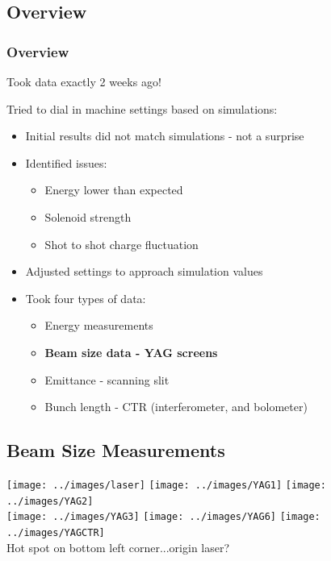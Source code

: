 \documentclass[professionalfonts,t]{beamer}
\begin{document}
\subsection{Overview}
\begin{frame}
	\frametitle{Overview}
Took data exactly 2 weeks ago!

Tried to dial in machine settings based on simulations:
\begin{itemize}
	\item Initial results did not match simulations - not a surprise
	\item Identified issues:
	\begin{itemize}
		\item Energy lower than expected
		\item Solenoid strength
		\item Shot to shot charge fluctuation
	\end{itemize}
	
	
	\item Adjusted settings to approach simulation values
	\item Took four types of data:
	\begin{itemize}
		\item Energy measurements
		\item \textbf{Beam size data - YAG screens}
		\item Emittance - scanning slit
		\item Bunch length - CTR (interferometer, and bolometer) 
	\end{itemize}
\end{itemize}

\end{frame}
\subsection{Beam Size Measurements}
\begin{frame}
	\vspace{-0.5em}
	\centering
    \texttt{[image: ../images/laser]}%
	\texttt{[image: ../images/YAG1]}%
	\texttt{[image: ../images/YAG2]}\\
	\texttt{[image: ../images/YAG3]}
	\texttt{[image: ../images/YAG6]}%
	\texttt{[image: ../images/YAGCTR]}\\
     Hot spot on bottom left corner...origin laser?  
\end{frame}
\end{document}
